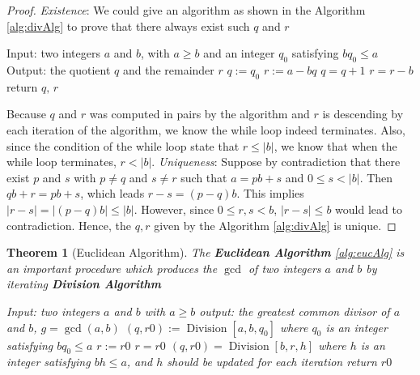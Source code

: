 \documentclass[paper=a4, fontsize=11pt]{scrartcl}
\newtheorem{theorem}{Theorem}[section]
\numberwithin{equation}{section}		%
\numberwithin{figure}{section}			%
\numberwithin{table}{section}				%
\newcommand{\Division}{\ensuremath{\operatorname{Division}}}
\theoremstyle{definition}
\theoremstyle{remark}
\theoremstyle{example}
\begin{document}
\begin{proof}
    \textit{Existence}: We could give an algorithm as shown in the Algorithm \ref{alg:divAlg} to prove that there always exist such $q$ and $r$
    \begin{algorithm}[H]
        \caption{Division$[a,b,q_0]$}\label{alg:divAlg}
        \begin{algorithmic}
            \State Input: two integers $a$ and $b$, with $a \geq b$ and an integer $q_0$ satisfying $bq_0 \leq a$
            \State Output: the quotient $q$ and the remainder $r$
            \newline
            \State $q := q_0$
            \State $r := a - bq$
                \State $q = q+1$
                \State $r = r-b$
            \EndWhile
            \State return $q,\, r$
        \end{algorithmic}
    \end{algorithm}
    Because $q$ and $r$ was computed in pairs by the algorithm and $r$ is descending by each iteration of the algorithm, we know the while loop indeed terminates. Also, since the condition of the while loop state that $r \leq \lvert b \rvert$, we know that when the while loop terminates, $r < \lvert b \rvert$.
    \newline
    \textit{Uniqueness}: Suppose by contradiction that there exist $p$ and $s$ with $p \neq q$ and $s \neq r$ such that $a = pb + s$ and $0 \leq s < \lvert b \rvert$. Then $qb + r = pb + s$, which leads $r - s = (p-q)b$. This implies $\lvert r - s \rvert = \lvert (p - q)b \rvert \leq \lvert b \rvert$. However, since $0 \leq r,s < b$, $\lvert r - s \rvert \leq b$ would lead to contradiction. Hence, the $q,r$ given by the Algorithm \ref{alg:divAlg} is unique.
\end{proof}

\begin{theorem}[Euclidean Algorithm]
    The \textbf{Euclidean Algorithm} \ref{alg:eucAlg} is an important procedure which produces the $\gcd$ of two integers $a$ and $b$ by iterating \textbf{Division Algorithm}
    \begin{algorithm}[H]
        \caption{Euclidean$[a,b]$}\label{alg:eucAlg}
        \begin{algorithmic}
            \State Input: two integers $a$ and $b$ with $a \geq b$
            \State output: the greatest common divisor of $a$ and $b$, $g = \gcd(a,b)$
            \newline
            \State $(q,r0) := \Division[a,b,q_0]$ where $q_0$ is an integer satisfying $bq_0 \leq a$
            \State $r := r0$
                \State $r = r0$
                \State $(q,r0) = \Division[b,r,h]$ where $h$ is an integer satisfying $bh \leq a$, and $h$ should be updated for each iteration
            \EndWhile
            \State return $r0$
        \end{algorithmic}
    \end{algorithm}
\end{theorem}
\end{document}
